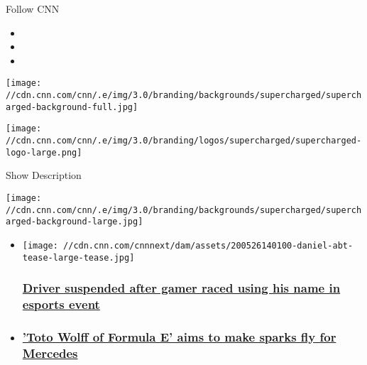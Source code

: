 Follow CNN

\begin{itemize}
\item
\item
\item
\end{itemize}

\texttt{[image: //cdn.cnn.com/cnn/.e/img/3.0/branding/backgrounds/supercharged/supercharged-background-full.jpg]}

\texttt{[image: //cdn.cnn.com/cnn/.e/img/3.0/branding/logos/supercharged/supercharged-logo-large.png]}

Show Description

\texttt{[image: //cdn.cnn.com/cnn/.e/img/3.0/branding/backgrounds/supercharged/supercharged-background-large.jpg]}

\begin{itemize}
\item
  \href{/2020/05/26/motorsport/daniel-abt-formula-e-suspended-audi-esports-spt-intl/index.html}{}

  \texttt{[image: //cdn.cnn.com/cnnnext/dam/assets/200526140100-daniel-abt-tease-large-tease.jpg]}

  \hypertarget{driver-suspended-after-gamer-raced-using-his-name-in-esports-event}{%
  \subsubsection{\texorpdfstring{\href{/2020/05/26/motorsport/daniel-abt-formula-e-suspended-audi-esports-spt-intl/index.html}{Driver
  suspended after gamer raced using his name in esports
  event}}{Driver suspended after gamer raced using his name in esports event}}\label{driver-suspended-after-gamer-raced-using-his-name-in-esports-event}}
\item
  \hypertarget{toto-wolff-of-formula-e-aims-to-make-sparks-fly-for-mercedes}{%
  \subsubsection{\texorpdfstring{\href{/2020/03/11/motorsport/toto-wolff-of-formula-e-spt-intl/index.html}{'Toto
  Wolff of Formula E' aims to make sparks fly for
  Mercedes}}{'Toto Wolff of Formula E' aims to make sparks fly for Mercedes}}\label{toto-wolff-of-formula-e-aims-to-make-sparks-fly-for-mercedes}}
\end{itemize}

